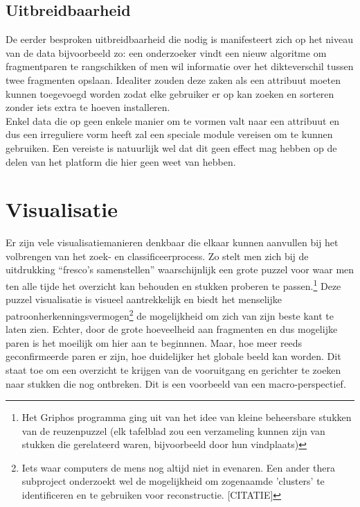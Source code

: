 \subsection{Uitbreidbaarheid}
De eerder besproken uitbreidbaarheid die nodig is manifesteert zich op het niveau van de data bijvoorbeeld zo: een onderzoeker vindt een nieuw algoritme om fragmentparen te rangschikken of men wil informatie over het dikteverschil tussen twee fragmenten opslaan. Idealiter zouden deze zaken als een attribuut moeten kunnen toegevoegd worden zodat elke gebruiker er op kan zoeken en sorteren zonder iets extra te hoeven installeren.\\
 
Enkel data die op geen enkele manier om te vormen valt naar een attribuut en dus een irreguliere vorm heeft zal een speciale module vereisen om te kunnen gebruiken. Een vereiste is natuurlijk wel dat dit geen effect mag hebben op de delen van het platform die hier geen weet van hebben.
 
\section{Visualisatie}
Er zijn vele visualisatiemanieren denkbaar die elkaar kunnen aanvullen bij het volbrengen van het zoek- en classificeerprocess. Zo stelt men zich bij de uitdrukking ``fresco's samenstellen'' waarschijnlijk een grote puzzel voor waar men ten alle tijde het overzicht kan behouden en stukken proberen te passen.\footnote{Het Griphos programma ging uit van het idee van kleine beheersbare stukken van de reuzenpuzzel (elk tafelblad zou een verzameling kunnen zijn van stukken die gerelateerd waren, bijvoorbeeld door hun vindplaats)} Deze puzzel visualisatie is visueel aantrekkelijk en biedt het menselijke patroonherkenningsvermogen\footnote{Iets waar computers de mens nog altijd niet in evenaren. Een ander thera subproject onderzoekt wel de mogelijkheid om zogenaamde 'clusters' te identificeren en te gebruiken voor reconstructie. [CITATIE]} de mogelijkheid om zich van zijn beste kant te laten zien. Echter, door de grote hoeveelheid aan fragmenten en dus mogelijke paren is het moeilijk om hier aan te beginnnen. Maar, hoe meer reeds geconfirmeerde paren er zijn, hoe duidelijker het globale beeld kan worden. Dit staat toe om een overzicht te krijgen van de vooruitgang en gerichter te zoeken naar stukken die nog ontbreken. Dit is een voorbeeld van een macro-perspectief.\\

